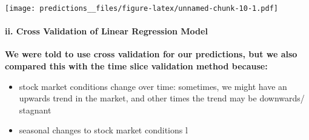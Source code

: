\documentclass[
]{article}
\begin{document}
\texttt{[image: predictions\_\_files/figure-latex/unnamed-chunk-10-1.pdf]}

\hypertarget{ii.-cross-validation-of-linear-regression-model}{%
\paragraph{ii. Cross Validation of Linear Regression
Model}\label{ii.-cross-validation-of-linear-regression-model}}

\textbf{We were told to use cross validation for our predictions, but we
also compared this with the time slice validation method because:}

\begin{itemize}
\item
  stock market conditions change over time: sometimes, we might have an
  upwards trend in the market, and other times the trend may be
  downwards/ stagnant
\item
  seasonal changes to stock market conditions l
\end{itemize}
\end{document}
